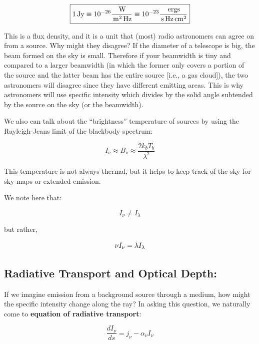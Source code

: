 \documentclass{article}
\newcommand{\unit}[1]{{\,\rm #1}}
\newcommand{\ergs}{\unit{ergs}}
\newcommand{\watts}{\unit{W}}
\newcommand{\s}{\unit{s}}
\newcommand{\cm}{\unit{cm}}
\newcommand{\m}{\unit{m}}
\newcommand{\hz}{\unit{Hz}}
\begin{document}
\begin{equation}
    \boxed{1 \unit{Jy} \equiv 10^{-26} \frac{\watts}{\m ^2 \hz} \equiv 10^{-23} \frac{\ergs}{\s \hz \cm^2}}
\end{equation}

This is a flux density, and it is a unit that (most) radio astronomers can agree on from a source. Why might they disagree? If the diameter of a telescope is big, the beam formed on the sky is small. Therefore if your beamwidth is tiny and compared to a larger beamwidth (in which the former only covers a portion of the source and the latter beam has the entire source [i.e., a gas cloud]), the two astronomers will disagree since they have different emitting areas. This is why astronomers will use specific intensity which divides by the solid angle subtended by the source on the sky (or the beamwidth). 

We also can talk about the ``brightness'' temperature of sources by using the Rayleigh-Jeans limit of the blackbody spectrum:

\begin{equation}
    I_\nu \approx B_\nu \approx \frac{2 k_b T_b}{\lambda^2}
\end{equation}

This temperature is not always thermal, but it helps to keep track of the sky for sky maps or extended emission. 

We note here that:

\begin{equation}
    I_\nu \neq I_\lambda
\end{equation}

but rather,

\begin{equation}
    \nu I_\nu = \lambda I_\lambda\\
\end{equation}


\subsection{Radiative Transport and Optical Depth:}

If we imagine emission from a background source through a medium, how might the specific intensity change along the ray? In asking this question, we naturally come to \textbf{equation of radiative transport}:

\begin{equation}
    \frac{d I_\nu}{ds} = j_\nu - \alpha_\nu I_\nu
\end{equation}
\end{document}
